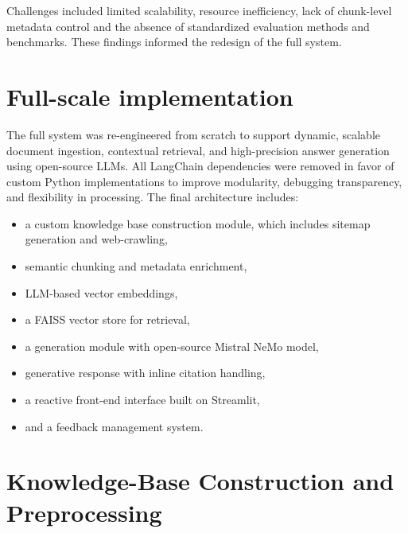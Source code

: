 \begin{spacing}{1.5}
Challenges included limited scalability, resource inefficiency, lack of chunk-level metadata control and the absence of standardized
evaluation methods and benchmarks. These findings informed the redesign of the full system.

\section{Full-scale implementation}
The full system was re-engineered from scratch to support dynamic, scalable document ingestion, contextual retrieval, and high-precision answer generation using open-source LLMs. All LangChain dependencies were removed in favor of custom Python implementations to improve modularity, debugging transparency, and flexibility in processing. The final architecture includes:
\begin{itemize}
      \item a custom knowledge base construction module, which includes sitemap generation and web-crawling,
      \item semantic chunking and metadata enrichment,
      \item LLM-based vector embeddings,
      \item a FAISS vector store for retrieval,
      \item a generation module with open-source Mistral NeMo model,
      \item generative response with inline citation handling,
      \item a reactive front-end interface built on Streamlit,
      \item and a feedback management system.
\end{itemize}

\sloppy
\section{Knowledge-Base Construction and Preprocessing}

\end{spacing}
